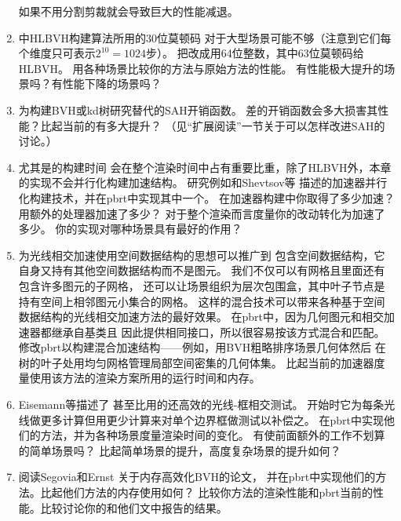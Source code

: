 \begin{enumerate}
          如果不用分割剪裁就会导致巨大的性能减退。
    \item \circletwo {}中HLBVH构建算法所用的30位莫顿码
          对于大型场景可能不够（注意到它们每个维度只可表示$2^{10}=1024$步）。
          把改成用64位整数，其中63位莫顿码给HLBVH。
          用各种场景比较你的方法与原始方法的性能。
          有性能极大提升的场景吗？有性能下降的场景吗？
    \item \circletwo 为构建BVH或kd树研究替代的SAH开销函数。
          差的开销函数会多大损害其性能？比起当前的有多大提升？
          （见“扩展阅读”一节关于可以怎样改进SAH的讨论。）
    \item \circlethree {}尤其是的构建时间
          会在整个渲染时间中占有重要比重，除了HLBVH外，本章的实现不会并行化构建加速结构。
          研究例如\citet{4342588}和Shevtsov等\parencite*{10.1111/j.1467-8659.2007.01062.x}
          描述的加速器并行化构建技术，并在pbrt中实现其中一个。
          在加速器构建中你取得了多少加速？用额外的处理器加速了多少？
          对于整个渲染而言度量你的改动转化为加速了多少。
          你的实现对哪种场景具有最好的作用？
    \item \circlethree 为光线相交加速使用空间数据结构的思想可以推广到
          包含空间数据结构，它自身又持有其他空间数据结构而不是图元。
          我们不仅可以有网格且里面还有包含许多图元的子网格，
          还可以让场景组织为层次包围盒，其中叶子节点是持有空间上相邻图元小集合的网格。
          这样的混合技术可以带来各种基于空间数据结构的光线相交加速方法的最好效果。
          在pbrt中，因为几何图元和相交加速器都继承自基类且
          因此提供相同接口，所以很容易按该方式混合和匹配。
          修改pbrt以构建混合加速结构——例如，用BVH粗略排序场景几何体然后
          在树的叶子处用均匀网格管理局部空间密集的几何体集。
          比起当前的加速器度量使用该方法的渲染方案所用的运行时间和内存。
    \item \circletwo Eisemann等\parencite*{10.1080/2151237X.2007.10129248}描述了
          甚至比用的还高效的光线-框相交测试。
          开始时它为每条光线做更多计算但用更少计算来对单个边界框做测试以补偿之。
          在pbrt中实现他们的方法，并为各种场景度量渲染时间的变化。
          有使前面额外的工作不划算的简单场景吗？
          比起简单场景的提升，高度复杂场景的提升如何？
    \item \circletwo 阅读Segovia和Ernst \parencite*{10.5555/1839214.1839242}关于内存高效化BVH的论文，
          并在pbrt中实现他们的方法。比起他们方法的内存使用如何？
          比较你方法的渲染性能和pbrt当前的性能。比较讨论你的和他们文中报告的结果。

\end{enumerate}
